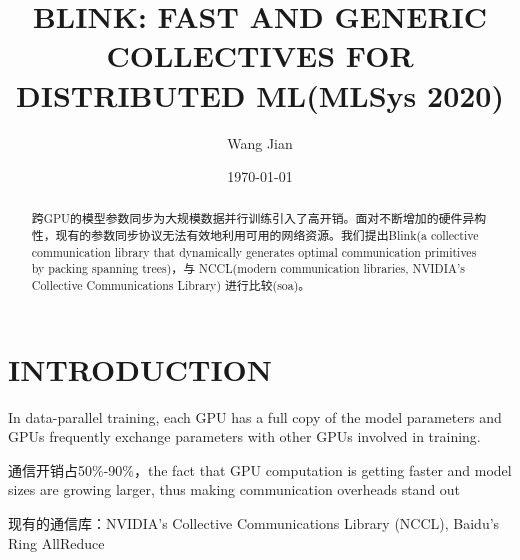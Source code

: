 \documentclass[11pt]{article}
\author{Wang Jian}
\date{\today}
\title{BLINK: FAST AND GENERIC COLLECTIVES FOR DISTRIBUTED ML(MLSys 2020)}
\begin{document}
\maketitle
\tableofcontents

\begin{abstract}
跨GPU的模型参数同步为大规模数据并行训练引入了高开销。面对不断增加的硬件异构性，现有的参数同步协议无法有效地利用可用的网络资源。我们提出Blink(a collective communication library that dynamically generates optimal communication primitives by packing spanning trees)，与 NCCL(modern communication libraries, NVIDIA’s Collective Communications Library) 进行比较(soa)。
\end{abstract}

\section{INTRODUCTION}
\label{sec:orgf77b832}
In data-parallel training, each GPU has a full copy of the model parameters and GPUs frequently exchange parameters with other GPUs involved in training.

通信开销占50\%-90\%，the fact that GPU computation is getting faster and model sizes are growing larger, thus making communication overheads stand out

现有的通信库：NVIDIA’s Collective Communications Library (NCCL),  Baidu’s Ring AllReduce 
\end{document}
